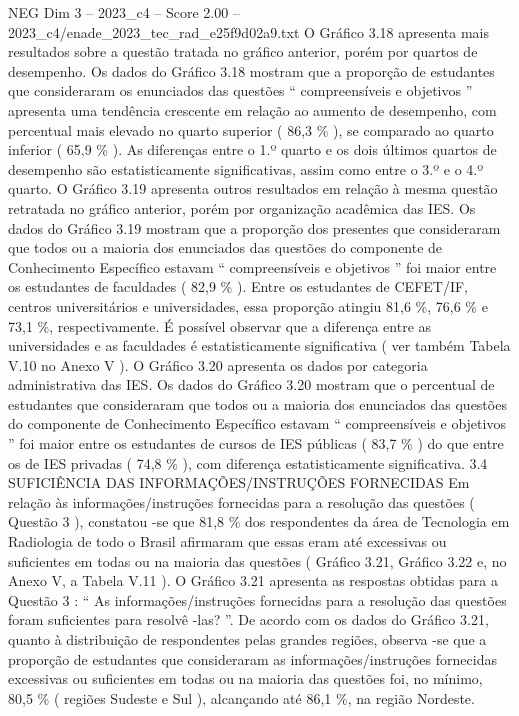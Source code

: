 \begin{textsample}{NEG Dim 3 – 2023\_c4 – Score 2.00 – 2023\_c4/enade\_2023\_tec\_rad\_e25f9d02a9.txt}
O Gráfico 3.18 apresenta mais resultados sobre a questão tratada no gráfico anterior, porém por quartos de desempenho.
Os dados do Gráfico 3.18 mostram que a proporção de estudantes que consideraram os enunciados das questões “ compreensíveis e objetivos ” apresenta uma tendência crescente em relação ao aumento de desempenho, com percentual mais elevado no quarto superior ( 86,3 \% ), se comparado ao quarto inferior ( 65,9 \% ).
As diferenças entre o 1.º quarto e os dois últimos quartos de desempenho são estatisticamente significativas, assim como entre o 3.º e o 4.º quarto.
O Gráfico 3.19 apresenta outros resultados em relação à mesma questão retratada no gráfico anterior, porém por organização acadêmica das IES.
Os dados do Gráfico 3.19 mostram que a proporção dos presentes que consideraram que todos ou a maioria dos enunciados das questões do componente de Conhecimento Específico estavam “ compreensíveis e objetivos ” foi maior entre os estudantes de faculdades ( 82,9 \% ).
Entre os estudantes de CEFET/IF, centros universitários e universidades, essa proporção atingiu 81,6 \%, 76,6 \% e 73,1 \%, respectivamente.
É possível observar que a diferença entre as universidades e as faculdades é estatisticamente significativa ( ver também Tabela V.10 no Anexo V ).
O Gráfico 3.20 apresenta os dados por categoria administrativa das IES.
Os dados do Gráfico 3.20 mostram que o percentual de estudantes que consideraram que todos ou a maioria dos enunciados das questões do componente de Conhecimento Específico estavam “ compreensíveis e objetivos ” foi maior entre os estudantes de cursos de IES públicas ( 83,7 \% ) do que entre os de IES privadas ( 74,8 \% ), com diferença estatisticamente significativa. 3.4 SUFICIÊNCIA DAS INFORMAÇÕES/INSTRUÇÕES FORNECIDAS Em relação às informações/instruções fornecidas para a resolução das questões ( Questão 3 ), constatou -se que 81,8 \% dos respondentes da área de Tecnologia em Radiologia de todo o Brasil afirmaram que essas eram até excessivas ou suficientes em todas ou na maioria das questões ( Gráfico 3.21, Gráfico 3.22 e, no Anexo V, a Tabela V.11 ).
O Gráfico 3.21 apresenta as respostas obtidas para a Questão 3 : “ As informações/instruções fornecidas para a resolução das questões foram suficientes para resolvê -las? ”.
De acordo com os dados do Gráfico 3.21, quanto à distribuição de respondentes pelas grandes regiões, observa -se que a proporção de estudantes que consideraram as informações/instruções fornecidas excessivas ou suficientes em todas ou na maioria das questões foi, no mínimo, 80,5 \% ( regiões Sudeste e Sul ), alcançando até 86,1 \%, na região Nordeste.

\end{textsample}

